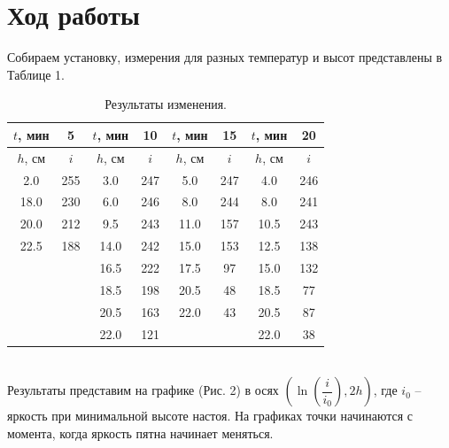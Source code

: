 \documentclass[a4paper,12pt]{article}
\begin{document}
\section*{Ход работы}
Собираем установку, измерения для разных температур и высот представлены в Таблице 1. 
\begin{table}[h]
\begin{tabular}{|c|c|c|c|c|c|c|c|}
\hline
$t$, мин              & 5               & $t$, мин & 10  & $t$, мин     & 15     & $t$, мин & 20  \\ \hline \hline
$h$, см               & $i$             & $h$, см  & $i$ & $h$, см      & $i$    & $h$, см  & $i$ \\ \hline
2.0                   & 255             & 3.0      & 247 & 5.0          & 247    & 4.0      & 246 \\ \hline
18.0                  & 230             & 6.0      & 246 & 8.0          & 244    & 8.0      & 241 \\ \hline
20.0                  & 212             & 9.5      & 243 & 11.0         & 157    & 10.5     & 243 \\ \hline
22.5                  & 188             & 14.0     & 242 & 15.0         & 153    & 12.5     & 138 \\ \hline 
\multicolumn{2}{|c|}{\multirow{4}{*}{}} & 16.5     & 222 & 17.5         & 97     & 15.0     & 132 \\ \cline{3-8} 
\multicolumn{2}{|c|}{}                  & 18.5     & 198 & 20.5         & 48     & 18.5     & 77  \\ \cline{3-8} 
\multicolumn{2}{|c|}{}                  & 20.5     & 163 & 22.0         & 43     & 20.5     & 87  \\ \cline{3-8} 
\multicolumn{2}{|c|}{}                  & 22.0     & 121 & \multicolumn{2}{c|}{} & 22.0     & 38  \\ \hline
\end{tabular}
\centering
\caption{Результаты изменения.}
\end{table}\\
Результаты представим на графике (Рис. 2) в осях $\left(\ln\left( \dfrac{i}{i_0} \right), 2h\right)$, где $i_0$ -- яркость при минимальной высоте настоя. На графиках точки начинаются с момента, когда яркость пятна начинает меняться.
\newpage
\end{document}
